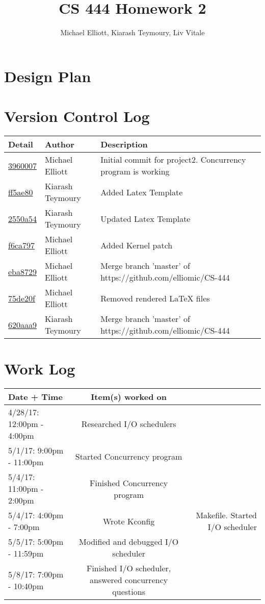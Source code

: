 {\bf }\documentclass[letterpaper,10pt,titlepage,draftclsnofoot,onecolumn]{IEEEtran}
\title{CS 444 Homework 2}
\author{Michael Elliott, Kiarash Teymoury, Liv Vitale}
\begin{document}
\section{Design Plan}


\section{Version Control Log}

\begin{tabular}{l l l}\textbf{Detail} & \textbf{Author} & \textbf{Description}\\\hline
\href{https://github.com/elliomic/CS-444/commit/3960007dcd2e09104c3b8163b326ba635a00fe25}{3960007} & Michael Elliott & Initial commit for project2. Concurrency program is working\\\hline
\href{https://github.com/elliomic/CS-444/commit/ff5ae8022f9a2cb63b4174945bec1f7ec3d67d77}{ff5ae80} & Kiarash Teymoury & Added Latex Template\\\hline
\href{https://github.com/elliomic/CS-444/commit/2550a5434d0e99148462ae4c27ee47d6649e1f84}{2550a54} & Kiarash Teymoury & Updated Latex Template\\\hline
\href{https://github.com/elliomic/CS-444/commit/f6ca797f7076ba4a3f300e6e777f1ff3dd782a0b}{f6ca797} & Michael Elliott & Added Kernel patch\\\hline
\href{https://github.com/elliomic/CS-444/commit/eba8729a916481d064ded4e5d0a9bc6aca866996}{eba8729} & Michael Elliott & Merge branch 'master' of https://github.com/elliomic/CS-444\\\hline
\href{https://github.com/elliomic/CS-444/commit/75de20f36af8f4e47207e25020e866469c3df88a}{75de20f} & Michael Elliott & Removed rendered LaTeX files\\\hline
\href{https://github.com/elliomic/CS-444/commit/620aaa92bd40125290c7e8fea12d804613227c1e}{620aaa9} & Kiarash Teymoury & Merge branch 'master' of https://github.com/elliomic/CS-444\\\hline
\hline\end{tabular}


\section{Work Log}
\begin{tabular}{l | c | r}
Date + Time & Item(s) worked on \\
\hline
4/28/17: 12:00pm - 4:00pm & Researched I/O schedulers \\
5/1/17: 9:00pm - 11:00pm & Started Concurrency program \\
5/4/17: 11:00pm - 2:00pm & Finished Concurrency program \\
5/4/17: 4:00pm - 7:00pm & Wrote Kconfig & Makefile. Started I/O scheduler \\
5/5/17: 5:00pm - 11:59pm & Modified and debugged I/O scheduler \\
5/8/17: 7:00pm - 10:40pm & Finished I/O scheduler, answered concurrency questions \\
\end{tabular}
\end{document}
